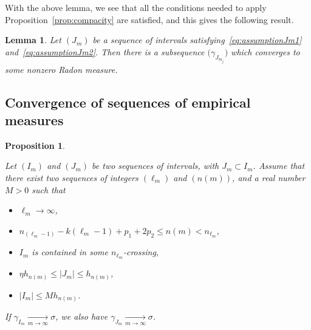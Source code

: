 \documentclass[10pt]{amsart}
\newtheorem{lemm}[theo]{Lemma}\newtheorem{prop}[theo]{Proposition}\newtheorem{coro}[theo]{Corollary}\newtheorem{conj}[theo]{Conjecture}
\theoremstyle{definition}\newtheorem{defi}[theo]{Definition}\newtheorem{rema}[theo]{Remark}\newtheorem{exam}[theo]{Example}\newtheorem{exem}[theo]{Example}\newtheorem{nota}[theo]{Notation}
\newcommand{\tend}[3][]{\xrightarrow[#2\to#3]{#1}}
\begin{document}
With the above lemma, we see that all the conditions needed to apply Proposition~\ref{prop:compacity} are satisfied, and this gives the following result.

\begin{lemm}\label{lemma:precompacity}
Let $(J_m)$ be a sequence of intervals satisfying~\eqref{eq:assumptionJm1} and~\eqref{eq:assumptionJm2}. Then there is a subsequence $\bigl(\gamma_{J_{m_j}}\bigr)$ which converges to some nonzero Radon measure.
\end{lemm}

\subsection{Convergence of sequences of empirical measures}

\begin{prop}\label{prop:convergence_empirical_measures_interval}

Let $(I_m)$ and $(J_m)$ be two sequences of intervals, with $J_m\subset I_m$. Assume that there exist two sequences of integers $(\ell_m)$ and $(n(m))$, and a real number $M>0$ such that
\begin{itemize}
\item $\ell_m\to\infty$,
\item $n_{(\ell_m-1)}-k(\ell_m-1) + p_1+ 2p_2 \le n(m)< n_{\ell_m}$,
\item $I_m$ is contained in some $n_{\ell_m}$-crossing,
\item $\eta h_{n(m)}\le |J_m| \le h_{n(m)}$,
\item $|I_m|\le M h_{n(m)}$.
\end{itemize}
If $\gamma_{I_m}\tend{m}{\infty}\sigma$, we also have $\gamma_{J_m}\tend{m}{\infty}\sigma$.
\end{prop}
\end{document}
